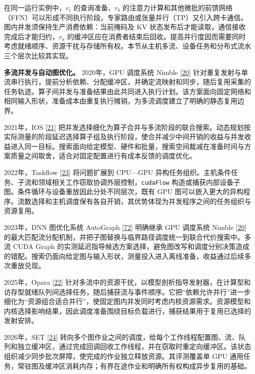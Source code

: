 \documentclass[UTF8,10.5pt,fontset=windows]{ctexart}
\begin{document}
在同一运行实例中，\(r_c\) 的查询准备、\(r_b\)
的注意力计算和其他微批的前馈网络（FFN）可以形成不同执行阶段，专家路由或张量并行（TP）又引入跨卡通信。图内并发须保持生产消费依赖：当前掩码及
KV 状态发布后才能读取，通信接收完成后才能归约，\(r_a\)
的缓冲区应在消费者结束后回收。提高并行度因而需要同时考虑就绪顺序、资源干扰与存储所有权。本节从主机多流、设备任务和分布式流水三个层次比较其实现。

\textbf{多流并发与自动图优化。} 2020年，GPU 调度系统 Nimble
{[}\protect\hyperlink{ref-kwon2020nimble}{20}{]}
针对重复发射与单流串行执行，提前分析依赖、分配缓冲区，并确定流映射和同步，随后复用采集的任务轨迹。算子间并发与准备结果由此共同进入执行计划。该方案面向固定网络和相同输入形状，准备成本由重复执行摊销，为多流调度建立了明确的静态复用边界。

2021年，IOS {[}\protect\hyperlink{ref-ding2021ios}{21}{]}
把并发选择细化为算子合并与多流阶段的联合搜索。动态规划按实际测量的阶段延迟选择算子组及执行阶段，使合并减少中间开销的收益与并发收益进入同一目标。搜索面向给定模型、硬件和批量，搜索空间裁减在准备时间与方案质量之间取舍，适合对固定配置进行有成本反馈的调度优化。

2022年，Taskflow {[}\protect\hyperlink{ref-huang2022taskflow}{23}{]}
将问题扩展到 CPU---GPU
异构任务组织。主机条件任务、子流和领域相关工作窃取协调外层控制，\nolinkurl{cudaFlow}
构造或捕获内部设备子图。条件循环与设备重放因此分处不同层次，既有 GPU
图可以嵌入更大的异构程序。流数选择和主机调度保有各自开销，其优势体现为并发程序之间的任务组织与资源复用。

2023年，DNN 图优化系统 AutoGraph
{[}\protect\hyperlink{ref-zhao2023autograph}{72}{]} 明确继承 GPU
调度系统 Nimble {[}\protect\hyperlink{ref-kwon2020nimble}{20}{]}
的最大匹配流分配机制，并把子图替换与临界路径调度统一到联合代价搜索中。多流
CUDA Graph
的实测延迟指导候选方案选择，避免图改写和调度分别决策造成的错配。搜索仍面向给定图与输入形状，测量投入进入离线准备，收益通过后续多次重放兑现。

2025年，Opara {[}\protect\hyperlink{ref-chen2025opara}{22}{]}
针对多流中的资源干扰，以模型剖析指导发射器，在计算型和访存型就绪队列间选择任务，随后捕获流与事件顺序。它把``依赖允许并行''进一步细化为``资源组合适合并行''，使固定图内并发同时考虑内核资源需求。资源模型和内核选择影响结果，因此调度准备围绕目标负载进行，捕获结果用于复用已选择的发射安排。

2026年，SET {[}\protect\hyperlink{ref-li2026set}{24}{]}
转向多个图作业之间的调度，给每个工作线程配置图、流、队列和独立缓冲区，通过完成回调回收工作线程，并在窃取时重定向缓冲区。该状态组织减少同步批次屏障，使完成的作业独立释放资源。其评测覆盖单
GPU
通用任务，常驻图及缓冲区消耗内存；有界在途作业和明确所有权构成异步复用的基础。
\end{document}
